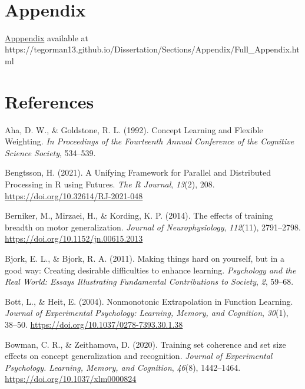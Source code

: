 \documentclass[
  11pt,
  letterpaper,
]{article}
\newlength{\cslhangindent}
\newenvironment{CSLReferences}[2] %
 {\begin{list}{}{%
  \setlength{\itemindent}{0pt}
  \setlength{\leftmargin}{0pt}
  \setlength{\parsep}{0pt}
  \ifodd #1
   \setlength{\leftmargin}{\cslhangindent}
   \setlength{\itemindent}{-1\cslhangindent}
  \fi
  \setlength{\itemsep}{#2\baselineskip}}}
 {\end{list}}
\begin{document}
~\\

\section{Appendix}\label{appendix}

\href{https://tegorman13.github.io/Dissertation/Sections/Appendix/Full_Appendix.html}{Apppendix}
available at
https://tegorman13.github.io/Dissertation/Sections/Appendix/Full\_Appendix.html

\section{References}\label{references}

\label{refs}
\begin{CSLReferences}{1}{0}
Aha, D. W., \& Goldstone, R. L. (1992). Concept {Learning} and {Flexible
Weighting}. \emph{In {Proceedings} of the {Fourteenth Annual Conference}
of the {Cognitive Science Society}}, 534--539.

Bengtsson, H. (2021). A {Unifying Framework} for {Parallel} and
{Distributed Processing} in {R} using {Futures}. \emph{The R Journal},
\emph{13}(2), 208. \url{https://doi.org/10.32614/RJ-2021-048}

Berniker, M., Mirzaei, H., \& Kording, K. P. (2014). The effects of
training breadth on motor generalization. \emph{Journal of
Neurophysiology}, \emph{112}(11), 2791--2798.
\url{https://doi.org/10.1152/jn.00615.2013}

Bjork, E. L., \& Bjork, R. A. (2011). Making things hard on yourself,
but in a good way: {Creating} desirable difficulties to enhance
learning. \emph{Psychology and the Real World: Essays Illustrating
Fundamental Contributions to Society}, \emph{2}, 59--68.

Bott, L., \& Heit, E. (2004). Nonmonotonic {Extrapolation} in {Function
Learning}. \emph{Journal of Experimental Psychology: Learning, Memory,
and Cognition}, \emph{30}(1), 38--50.
\url{https://doi.org/10.1037/0278-7393.30.1.38}

Bowman, C. R., \& Zeithamova, D. (2020). Training set coherence and set
size effects on concept generalization and recognition. \emph{Journal of
Experimental Psychology. Learning, Memory, and Cognition}, \emph{46}(8),
1442--1464. \url{https://doi.org/10.1037/xlm0000824}


\end{CSLReferences}
\end{document}
